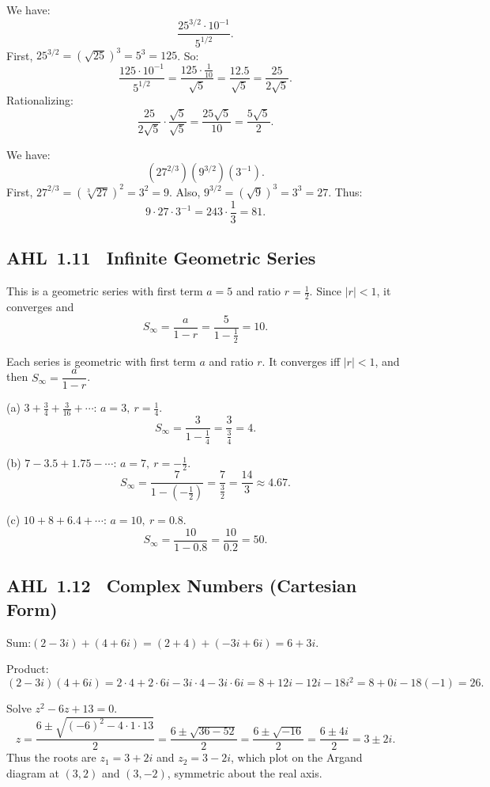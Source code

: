 \documentclass[11pt]{article}
\def\textbf#1{#1}%
\newcommand{\tocsubsection}[1]{\subsection{#1}}
\begin{document}
\begin{solution}
We have:
\[
\frac{25^{3/2} \cdot 10^{-1}}{5^{1/2}}.
\]
First, \(25^{3/2} = (\sqrt{25})^3 = 5^3 = 125\).  
So:
\[
\frac{125 \cdot 10^{-1}}{5^{1/2}} = \frac{125 \cdot \frac{1}{10}}{\sqrt{5}} 
= \frac{12.5}{\sqrt{5}} = \frac{25}{2\sqrt{5}}.
\]
Rationalizing:
\[
\frac{25}{2\sqrt{5}} \cdot \frac{\sqrt{5}}{\sqrt{5}} = \frac{25\sqrt{5}}{10} = \frac{5\sqrt{5}}{2}.
\]
\end{solution}


\begin{solution}
We have:
\[
(27^{2/3})(9^{3/2})(3^{-1}).
\]
First, \(27^{2/3} = (\sqrt[3]{27})^2 = 3^2 = 9\).  
Also, \(9^{3/2} = (\sqrt{9})^3 = 3^3 = 27\).  
Thus:
\[
9 \cdot 27 \cdot 3^{-1} = 243 \cdot \frac{1}{3} = 81.
\]
\end{solution}


\tocsubsection{AHL 1.11 \; Infinite Geometric Series}


\begin{solution}
This is a geometric series with first term \(a=5\) and ratio \(r=\tfrac12\).
Since \(|r|<1\), it converges and
\[
S_\infty=\frac{a}{1-r}=\frac{5}{1-\frac12}=10.
\]
\end{solution}


\begin{solution}
Each series is geometric with first term \(a\) and ratio \(r\). It converges iff \(|r|<1\), and then \(S_\infty=\dfrac{a}{1-r}\).

\medskip
\textbf{(a)} \(3+\tfrac34+\tfrac{3}{16}+\cdots\): \(a=3,\ r=\tfrac14\).
\[
S_\infty=\frac{3}{1-\frac14}=\frac{3}{\frac34}=4.
\]

\textbf{(b)} \(7-3.5+1.75-\cdots\): \(a=7,\ r=-\tfrac12\).
\[
S_\infty=\frac{7}{1-(-\frac12)}=\frac{7}{\frac32}=\frac{14}{3}\approx4.67.
\]

\textbf{(c)} \(10+8+6.4+\cdots\): \(a=10,\ r=0.8\).
\[
S_\infty=\frac{10}{1-0.8}=\frac{10}{0.2}=50.
\]
\end{solution}


\tocsubsection{AHL 1.12 \; Complex Numbers (Cartesian Form)}

\begin{solution}
\textbf{Sum:}\quad $(2-3i)+(4+6i) = (2+4) + (-3i+6i) = 6+3i$.

\medskip
\textbf{Product:}\quad 
\[
(2-3i)(4+6i) 
= 2\cdot4 + 2\cdot6i - 3i\cdot4 - 3i\cdot6i
= 8 + 12i - 12i - 18i^{2}
= 8 + 0i - 18(-1)
= 26.
\]
\end{solution}

\begin{solution}
Solve \(z^{2}-6z+13=0\).
\[
z=\frac{6\pm\sqrt{(-6)^{2}-4\cdot1\cdot13}}{2}
= \frac{6\pm\sqrt{36-52}}{2}
= \frac{6\pm\sqrt{-16}}{2}
= \frac{6\pm 4i}{2}
= 3\pm 2i.
\]
Thus the roots are \(z_1=3+2i\) and \(z_2=3-2i\), which plot on the Argand diagram at
\((3,2)\) and \((3,-2)\), symmetric about the real axis.
\end{solution}
\end{document}
